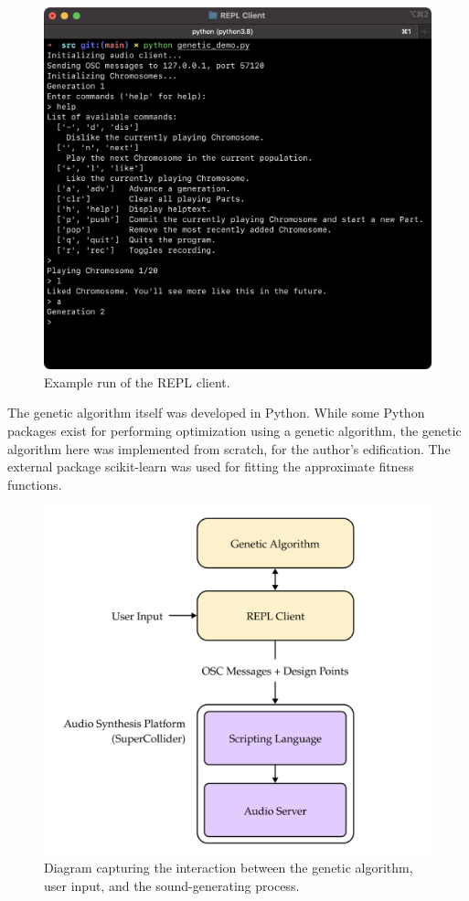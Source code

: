 \documentclass[conference]{IEEEtran}
\begin{document}
\begin{figure}[htbp]
    \centerline{\includegraphics[width=0.9\columnwidth]{figs/repl-client.png}}
    \caption{Example run of the REPL client.}
    \label{repl}
\end{figure}

The genetic algorithm itself was developed in Python. While some Python
packages exist for performing optimization using a genetic algorithm, the
genetic algorithm here was implemented from scratch, for the author's
edification. The external package scikit-learn \cite{sklearn} was used
for fitting the approximate fitness functions.

\begin{figure}[htbp]
    \centerline{\includegraphics[width=0.9\columnwidth]{figs/arch.png}}
    \caption{Diagram capturing the interaction between the genetic
        algorithm, user input, and the sound-generating process.}
    \label{arch}
\end{figure}
\end{document}
